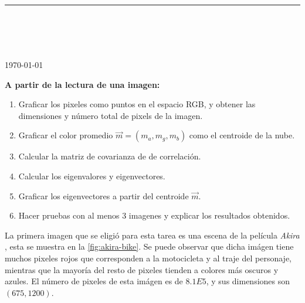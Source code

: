 



\thispagestyle{empty}

\begin{center}
\textsc{\theinstitution}\\[2mm]

\thedepartment

\rule{0.6\textwidth}{0.5pt}\\[2mm]

\thecourse \\[4mm]

{\Large \textbf{\thetitle}}\\[2mm]

\theauthor \\[2mm]

{\small \today}
\end{center}
\medskip

\vspace{1cm}

\textbf{%
A partir de la lectura de una imagen:}
\begin{enumerate}
    \item Graficar los pixeles como puntos en el espacio RGB, y obtener las dimensiones y número total de pixels de la imagen.
    \item Graficar el color promedio $\vec{m} = (m_a, m_g, m_b)$ como el centroide de la nube.
    \item Calcular la matriz de covarianza de de correlación.
    \item Calcular los eigenvalores y eigenvectores.
    \item Graficar los eigenvectores a partir del centroide $\vec{m}$.
    \item Hacer pruebas con al menos 3 imagenes y explicar los resultados obtenidos.
\end{enumerate}

\vspace{1cm}

La primera imagen que se eligió para esta tarea es una escena de la película \textit{Akira} \cite{katsuhiro1998akira}, esta se muestra en la \cref{fig:akira-bike}. Se puede observar que dicha imágen tiene muchos pixeles rojos que corresponden a la motocicleta y al traje del personaje, mientras que la mayoría del resto de pixeles tienden a colores más oscuros y azules. El número de pixeles de esta imágen es de $8.1E5$, y sus dimensiones son $(675, 1200)$.

